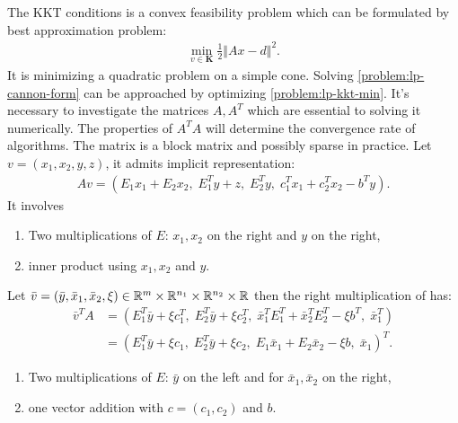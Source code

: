 \documentclass[12pt]{report}
\begin{document}
            The KKT conditions is a convex feasibility problem which can be formulated by best approximation problem: 
            \begin{align}\label{problem:lp-kkt-min}
                \min_{v \in \mathbf K} 
                \frac{1}{2}\Vert Ax - d \Vert^2. 
            \end{align}
            It is minimizing a quadratic problem on a simple cone. 
            Solving \eqref{problem:lp-cannon-form} can be approached by optimizing \eqref{problem:lp-kkt-min}. 
            It's necessary to investigate the matrices $A, A^T$ which are essential to solving it numerically. 
            The properties of $A^TA$ will determine the convergence rate of algorithms. 
            The matrix is a block matrix and possibly sparse in practice. 
            Let $v = (x_1, x_2, y, z)$, it admits implicit representation: 
            \begin{align*}
                Av = (E_1x_1 + E_2 x_2,\; E_1^Ty + z,\; E_2^Ty,\; c^T_1x_1 + c_2^Tx_2 - b^Ty). 
            \end{align*}
            It involves 
            \begin{enumerate}
                \item Two multiplications of $E$: $x_1, x_2$ on the right and $y$ on the right,  
                \item inner product using $x_1, x_2$ and $y$. 
            \end{enumerate}
            Let $\bar v = (\bar y, \bar x_1, \bar x_2, \xi) \in \mathbb R^m\times \mathbb R^{n_1} \times \mathbb R^{n_2}\times \mathbb R$ then the right multiplication of has: 
            \begin{align*}
                \bar v^TA  &= (
                    E_1^T\bar y + \xi c_1^T,\; E_2^T\bar y + \xi c_2^T,\; 
                    \bar x_1^TE_1^T + \bar x_2^TE_2^T - \xi b^T,\; \bar x_1^T
                )
                \\
                &= 
                (
                    E_1^T\bar y + \xi c_1, \;
                    E_2^T \bar y + \xi c_2, \;
                    E_1\bar x_1 + E_2\bar x_2 - \xi b, \;
                    \bar x_1
                )^T. 
            \end{align*}
            \begin{enumerate}
                \item Two multiplications of $E$: $\bar y$ on the left and for $\bar x_1, \bar x_2$ on the right, 
                \item one vector addition with $c = (c_1, c_2)$ and $b$. 
            \end{enumerate}
\end{document}
